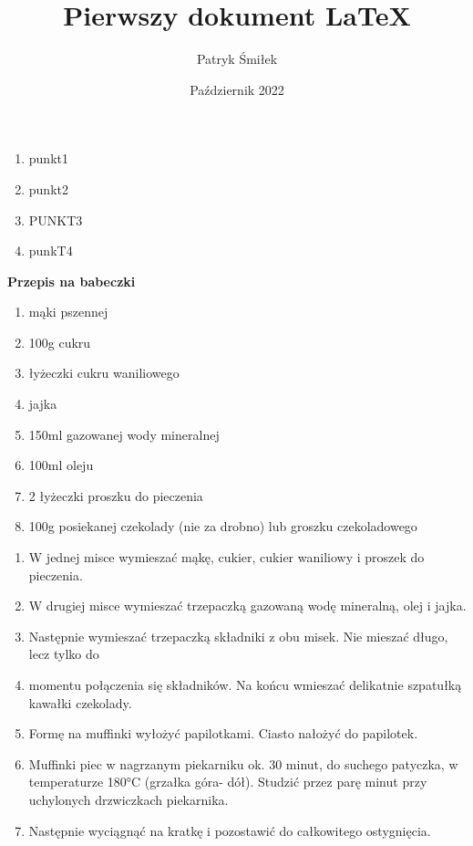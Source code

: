 \documentclass[12pt, letterpaper, titlepage]{article}
\title{Pierwszy dokument LaTeX}
\author{Patryk Śmiłek}
\date{Październik 2022}
\begin{document}
\maketitle
\begin{enumerate}
\item punkt1
\item punkt2
\item PUNKT3
\item punkT4
\end{enumerate}
\newpage
\textbf{Przepis na babeczki}
\newline
\begin{enumerate}
\item mąki pszennej
\item 100g cukru
\item łyżeczki cukru waniliowego
\item jajka
\item 150ml gazowanej wody mineralnej
\item 100ml oleju
\item 2 łyżeczki proszku do pieczenia
\item 100g posiekanej czekolady (nie za drobno) lub groszku czekoladowego
\end{enumerate}
\begin{enumerate}
\item W jednej misce wymieszać mąkę, cukier, cukier waniliowy i proszek do pieczenia.
\item W drugiej misce wymieszać trzepaczką gazowaną wodę mineralną, olej i jajka.
\item Następnie wymieszać trzepaczką składniki z obu misek. Nie mieszać długo, lecz tylko do \item momentu połączenia się składników. Na końcu wmieszać delikatnie szpatułką kawałki czekolady.
\item Formę na muffinki wyłożyć papilotkami. Ciasto nałożyć do papilotek.
\item Muffinki piec w nagrzanym piekarniku ok. 30 minut, do suchego patyczka, w temperaturze 180°C (grzałka góra- dół). Studzić przez parę minut przy uchylonych drzwiczkach piekarnika. \item Następnie wyciągnąć na kratkę i pozostawić do całkowitego ostygnięcia.
\end{enumerate}
\end{document}

